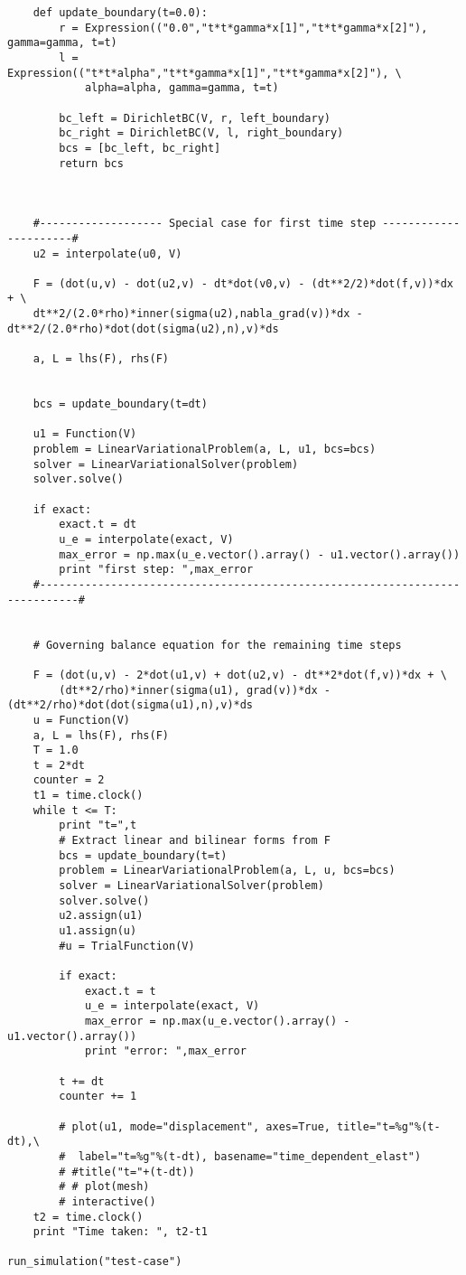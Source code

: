 \documentclass[twoside]{article}
\begin{document}
\begin{verbatim}
	def update_boundary(t=0.0):
		r = Expression(("0.0","t*t*gamma*x[1]","t*t*gamma*x[2]"), gamma=gamma, t=t)
		l = Expression(("t*t*alpha","t*t*gamma*x[1]","t*t*gamma*x[2]"), \
			alpha=alpha, gamma=gamma, t=t)

		bc_left = DirichletBC(V, r, left_boundary)
		bc_right = DirichletBC(V, l, right_boundary)
		bcs = [bc_left, bc_right]
		return bcs



	#------------------- Special case for first time step ----------------------#
	u2 = interpolate(u0, V)

	F = (dot(u,v) - dot(u2,v) - dt*dot(v0,v) - (dt**2/2)*dot(f,v))*dx + \
	dt**2/(2.0*rho)*inner(sigma(u2),nabla_grad(v))*dx - dt**2/(2.0*rho)*dot(dot(sigma(u2),n),v)*ds

	a, L = lhs(F), rhs(F)


	bcs = update_boundary(t=dt)

	u1 = Function(V)
	problem = LinearVariationalProblem(a, L, u1, bcs=bcs)
	solver = LinearVariationalSolver(problem)
	solver.solve()

	if exact:
		exact.t = dt
		u_e = interpolate(exact, V)
		max_error = np.max(u_e.vector().array() - u1.vector().array())
		print "first step: ",max_error
	#----------------------------------------------------------------------------#


	# Governing balance equation for the remaining time steps

	F = (dot(u,v) - 2*dot(u1,v) + dot(u2,v) - dt**2*dot(f,v))*dx + \
		(dt**2/rho)*inner(sigma(u1), grad(v))*dx - (dt**2/rho)*dot(dot(sigma(u1),n),v)*ds
	u = Function(V)
	a, L = lhs(F), rhs(F)
	T = 1.0
	t = 2*dt
	counter = 2
	t1 = time.clock()
	while t <= T:
		print "t=",t
		# Extract linear and bilinear forms from F
		bcs = update_boundary(t=t)
		problem = LinearVariationalProblem(a, L, u, bcs=bcs)
		solver = LinearVariationalSolver(problem)
		solver.solve()
		u2.assign(u1)
		u1.assign(u)
		#u = TrialFunction(V)

		if exact:
			exact.t = t
			u_e = interpolate(exact, V)
			max_error = np.max(u_e.vector().array() - u1.vector().array())
			print "error: ",max_error

		t += dt
		counter += 1

		# plot(u1, mode="displacement", axes=True, title="t=%g"%(t-dt),\
		#  label="t=%g"%(t-dt), basename="time_dependent_elast")
		# #title("t="+(t-dt))
		# # plot(mesh)
		# interactive()
	t2 = time.clock()
	print "Time taken: ", t2-t1

run_simulation("test-case")
\end{verbatim}
\end{document}
